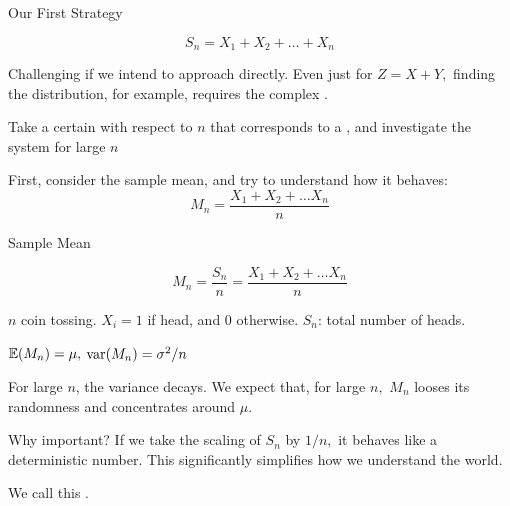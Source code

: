 \documentclass[fleqn,aspectratio=169]{beamer}
\begin{document}
\begin{frame}{Our First Strategy}

$$
S_n = X_1 + X_2 + \ldots + X_n
$$
\vspace{-0.8cm}
\plitemsep 0.1in
\bci 
\item<2-> Challenging if we intend to approach directly. Even just for $Z=X+Y,$ finding the distribution, for example, requires the complex . 

\item<3-> Take a certain  with respect to $n$ that corresponds to a , and investigate the system for large $n$ 

\item<4-> First, consider the sample mean, and try to understand how it behaves:
$$
M_n = \frac{X_1 + X_2+ \ldots X_n}{n}
$$

\eci 

\end{frame}

\begin{frame}{Sample Mean}

$$
M_n = \frac{S_n}{n} = \frac{X_1 + X_2+ \ldots X_n}{n}
$$

\plitemsep 0.1in

\bci 
\item<2->  $n$ coin tossing. $X_i=1$ if head, and 0 otherwise. $S_n$: total number of heads.

\item<3-> $\mathbb{E}( M_n ) = \mu,$ $\text{var}( M_n ) = \sigma^2/n$

\item<4-> For large $n$, the variance decays. We expect that, for large $n,$ $M_n$ looses its randomness and concentrates around $\mu.$

\item<5-> Why important? If we take the scaling of $S_n$ by $1/n,$ it behaves like a deterministic number. This significantly simplifies how we understand the world.

\item<6-> We call this .
\eci 

\end{frame}
\end{document}
